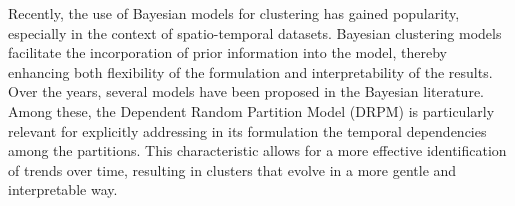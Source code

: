 \documentclass[12pt,	%
	a4paper,		%
	twoside,		%
	openright,		%
	titlepage,%
	]{book}
\theoremstyle{definition}
\let\cite\citep
\begin{document}
Recently, the use of Bayesian models for clustering has gained popularity, especially in the context of spatio-temporal datasets. Bayesian clustering models facilitate the incorporation of prior information into the model, thereby enhancing both flexibility of the formulation and interpretability of the results. Over the years, several models have been proposed in the Bayesian literature. Among these, the Dependent Random Partition Model (DRPM) \cite{1-drpm} is particularly relevant for explicitly addressing in its formulation the temporal dependencies among the partitions. This characteristic allows for a more effective identification of trends over time, resulting in clusters that evolve in a more gentle and interpretable way.
\end{document}
